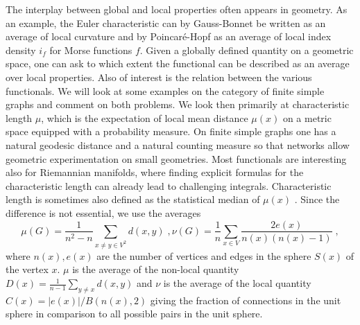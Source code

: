 \documentclass[12pt]{amsart}
\theoremstyle{definition}
\begin{document}
The interplay between global and local properties often appears in 
geometry. As an example, the Euler characteristic can by Gauss-Bonnet be written 
as an average of local curvature and by Poincar\'e-Hopf as an average of local index density $i_f$
for Morse functions $f$. Given a globally defined quantity on a geometric space, one
can ask to which extent the functional can be described as an average over local properties.
Also of interest is the relation between the various functionals. 
We will look at some examples on the category of finite simple graphs and comment on both 
problems. We look then primarily at characteristic length $\mu$, which is the expectation of 
local mean distance $\mu(x)$ on a metric space equipped with a probability measure. 
On finite simple graphs one has a natural geodesic distance and a natural counting measure so that
networks allow geometric experimentation on small geometries. Most functionals are 
interesting also for Riemannian manifolds, where finding explicit formulas for the characteristic length
can already lead to challenging integrals. Characteristic length is sometimes also defined
as the statistical median of $\mu(x)$ \cite{SmallWorld}. Since the difference is not essential, we use the averages
$$ \mu(G) = \frac{1}{n^2-n} \sum_{x \neq y \in V^2} d(x,y) \; , 
   \nu(G) = \frac{1}{n} \sum_{x \in V} \frac{2e(x)}{n(x)(n(x)-1)}  \; , $$
where $n(x),e(x)$ are the number of vertices and edges in the sphere $S(x)$ of the vertex $x$. 
$\mu$ is the average of the non-local quantity $D(x)=\frac{1}{n-1} \sum_{y \neq x} d(x,y)$ and 
$\nu$ is the average of the local quantity $C(x) = |e(x)|/B(n(x),2)$ giving the fraction of
connections in the unit sphere in comparison to all possible pairs in the unit sphere. \\
\end{document}
